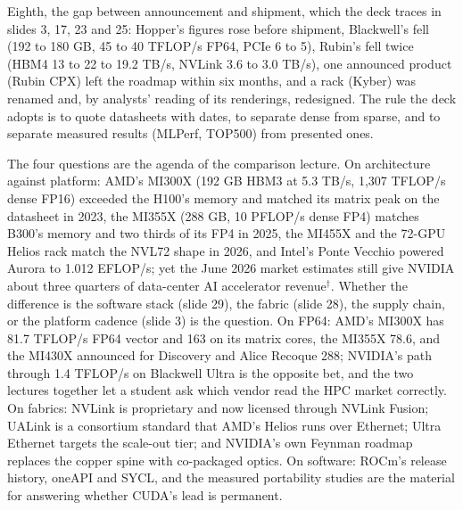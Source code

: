 \documentclass[11pt,letterpaper]{article}
\begin{document}
Eighth, the gap between announcement and shipment, which the deck traces in slides 3, 17, 23 and 25: Hopper's figures rose before shipment, Blackwell's fell (192 to 180 GB, 45 to 40 TFLOP/s FP64, PCIe 6 to 5), Rubin's fell twice (HBM4 13 to 22 to 19.2 TB/s, NVLink 3.6 to 3.0 TB/s), one announced product (Rubin CPX) left the roadmap within six months, and a rack (Kyber) was renamed and, by analysts' reading of its renderings, redesigned. The rule the deck adopts is to quote datasheets with dates, to separate dense from sparse, and to separate measured results (MLPerf, TOP500) from presented ones.

The four questions are the agenda of the comparison lecture. On architecture against platform: AMD's MI300X (192 GB HBM3 at 5.3 TB/s, 1,307 TFLOP/s dense FP16) exceeded the H100's memory and matched its matrix peak on the datasheet in 2023, the MI355X (288 GB, 10 PFLOP/s dense FP4) matches B300's memory and two thirds of its FP4 in 2025, the MI455X and the 72-GPU Helios rack match the NVL72 shape in 2026, and Intel's Ponte Vecchio powered Aurora to 1.012 EFLOP/s; yet the June 2026 market estimates still give NVIDIA about three quarters of data-center AI accelerator revenue$^\dagger$. Whether the difference is the software stack (slide 29), the fabric (slide 28), the supply chain, or the platform cadence (slide 3) is the question. On FP64: AMD's MI300X has 81.7 TFLOP/s FP64 vector and 163 on its matrix cores, the MI355X 78.6, and the MI430X announced for Discovery and Alice Recoque 288; NVIDIA's path through 1.4 TFLOP/s on Blackwell Ultra is the opposite bet, and the two lectures together let a student ask which vendor read the HPC market correctly. On fabrics: NVLink is proprietary and now licensed through NVLink Fusion; UALink is a consortium standard that AMD's Helios runs over Ethernet; Ultra Ethernet targets the scale-out tier; and NVIDIA's own Feynman roadmap replaces the copper spine with co-packaged optics. On software: ROCm's release history, oneAPI and SYCL, and the measured portability studies are the material for answering whether CUDA's lead is permanent.
\end{document}
